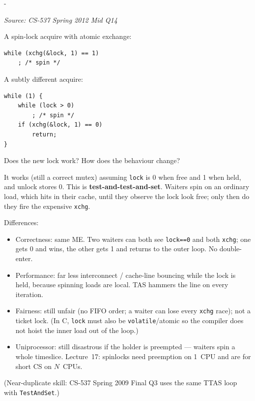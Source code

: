 \documentclass[11pt,a4paper]{article}
\makeatletter
\newcommand{\keepspace}[1]{\par\penalty-100\begingroup
  \setlength{\dimen@}{#1}\dimen@ii\pagegoal\advance\dimen@ii-\pagetotal
  \ifdim\dimen@>\dimen@ii\ifdim\dimen@ii>\z@\vfil\fi\break\fi\endgroup}
\newcounter{qn}[section]
\newenvironment{Qn}[4]{%
  \refstepcounter{qn}\keepspace{7\baselineskip}%
  \begin{tcolorbox}[qboxstyle, title={Q\thesection.\theqn\ \ [#1 \textbar\ #2]\ \ #4}]%
  {\footnotesize\color{g3}\textit{Source: #3}}\par\smallskip%
}{%
  \end{tcolorbox}%
}
\newenvironment{Sol}{%
  \begin{tcolorbox}[sboxstyle, title={Solution}]%
}{%
  \end{tcolorbox}\vspace{0.35em}%
}
\makeatother
\begin{document}
\begin{Qn}{Hard}{Lect 17}{CS-537 Spring 2012 Mid Q14}{TAS versus test-and-test-and-set}
A spin-lock acquire with atomic exchange:

\begin{lstlisting}[numbers=none]
while (xchg(&lock, 1) == 1)
    ; /* spin */
\end{lstlisting}

A subtly different acquire:

\begin{lstlisting}[numbers=none]
while (1) {
    while (lock > 0)
        ; /* spin */
    if (xchg(&lock, 1) == 0)
        return;
}
\end{lstlisting}

Does the new lock work? How does the behaviour change?
\end{Qn}
\begin{Sol}
It works (still a correct mutex) assuming \texttt{lock} is 0 when free and 1 when held, and unlock stores 0. This is \textbf{test-and-test-and-set}. Waiters spin on an ordinary load, which hits in their cache, until they observe the lock look free; only then do they fire the expensive \texttt{xchg}.

Differences:
\begin{itemize}
\item Correctness: same ME. Two waiters can both see \texttt{lock==0} and both \texttt{xchg}; one gets 0 and wins, the other gets 1 and returns to the outer loop. No double-enter.
\item Performance: far less interconnect / cache-line bouncing while the lock is held, because spinning loads are local. TAS hammers the line on every iteration.
\item Fairness: still unfair (no FIFO order; a waiter can lose every \texttt{xchg} race); not a ticket lock. (In C, \texttt{lock} must also be \texttt{volatile}/atomic so the compiler does not hoist the inner load out of the loop.)
\item Uniprocessor: still disastrous if the holder is preempted --- waiters spin a whole timeslice. Lecture~17: spinlocks need preemption on 1~CPU and are for short CS on $N$~CPUs.
\end{itemize}

(Near-duplicate skill: CS-537 Spring 2009 Final Q3 uses the same TTAS loop with \texttt{TestAndSet}.)
\end{Sol}
\end{document}
